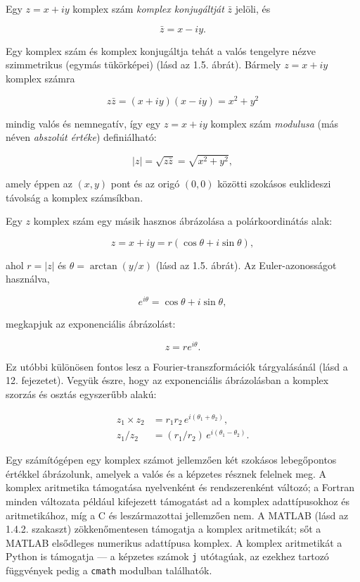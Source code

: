 \documentclass[
  magyar,
  11pt]{article}
\begin{document}
Egy \(z = x + iy\) komplex szám \emph{komplex konjugáltját} \(\bar{z}\)
jelöli, és

\[\bar{z} = x - iy.\]

Egy komplex szám és komplex konjugáltja tehát a valós tengelyre nézve
szimmetrikus (egymás tükörképei) (lásd az 1.5. ábrát). Bármely
\(z = x + iy\) komplex számra

\[z\bar{z} = (x + iy)(x - iy) = x^2 + y^2\]

mindig valós és nemnegatív, így egy \(z = x + iy\) komplex szám
\emph{modulusa} (más néven \emph{abszolút értéke}) definiálható:

\[|z| = \sqrt{z\bar{z}} = \sqrt{x^2 + y^2},\]

amely éppen az \((x, y)\) pont és az origó \((0, 0)\) közötti szokásos
euklideszi távolság a komplex számsíkban.

Egy \(z\) komplex szám egy másik hasznos ábrázolása a polárkoordinátás
alak:

\[z = x + iy = r(\cos\theta + i\sin\theta),\]

ahol \(r = |z|\) és \(\theta = \arctan(y/x)\) (lásd az 1.5. ábrát). Az
Euler-azonosságot használva,

\[e^{i\theta} = \cos\theta + i\sin\theta,\]

megkapjuk az exponenciális ábrázolást:

\[z = r e^{i\theta}.\]

Ez utóbbi különösen fontos lesz a Fourier-transzformációk tárgyalásánál
(lásd a 12. fejezetet). Vegyük észre, hogy az exponenciális ábrázolásban
a komplex szorzás és osztás egyszerűbb alakú:

\[\begin{aligned}
z_1 \times z_2 &= r_1 r_2\, e^{i(\theta_1 + \theta_2)}, \\
z_1 / z_2 &= (r_1 / r_2)\, e^{i(\theta_1 - \theta_2)}.
\end{aligned}\]

Egy számítógépen egy komplex számot jellemzően két szokásos lebegőpontos
értékkel ábrázolunk, amelyek a valós és a képzetes résznek felelnek meg.
A komplex aritmetika támogatása nyelvenként és rendszerenként változó; a
Fortran minden változata például kifejezett támogatást ad a komplex
adattípusokhoz és aritmetikához, míg a C és leszármazottai jellemzően
nem. A MATLAB (lásd az 1.4.2. szakaszt) zökkenőmentesen támogatja a
komplex aritmetikát; sőt a MATLAB elsődleges numerikus adattípusa
komplex. A komplex aritmetikát a Python is támogatja --- a képzetes
számok \texttt{j} utótagúak, az ezekhez tartozó függvények pedig a
\texttt{cmath} modulban találhatók.
\end{document}
